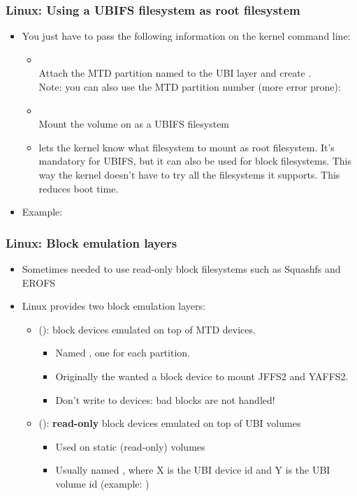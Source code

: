 \begin{frame}
  \frametitle{Linux: Using a UBIFS filesystem as root filesystem}
  \begin{itemize}
  \item You just have to pass the following information on the kernel
    command line:
    \begin{itemize}
    \item {}\\
      Attach the MTD partition named  to the UBI layer and
      create .\\
      Note: you can also use the MTD partition number (more error
      prone): 
    \item {}\\
      Mount the  volume on  as a UBIFS filesystem
    \item {} lets the kernel know what filesystem
      to mount as root filesystem. It's mandatory for UBIFS, but
      it can also be used for block filesystems. This way the kernel
      doesn't have to try all the filesystems it supports. This reduces
      boot time.
    \end{itemize}
  \item Example: 
  \end{itemize}
\end{frame}

\begin{frame}
  \frametitle{Linux: Block emulation layers}
  \begin{itemize}
  \item Sometimes needed to use read-only block filesystems such as Squashfs and EROFS
  \item Linux provides two block emulation layers:
    \begin{itemize}
    \item {} ():
       block devices emulated on top of MTD devices.
       \begin{itemize}
       \item Named , one for each partition.
       \item Originally the  wanted a block device to mount JFFS2 and YAFFS2.
       \item Don't write to  devices: bad blocks are not handled!
       \end{itemize}
    \item {} ():
       {\bf read-only} block devices emulated on top of UBI volumes
       \begin{itemize}
       \item Used on static (read-only) volumes
       \item Usually named , where X is the UBI device
             id and Y is the UBI volume id (example: )
       \end{itemize}
    \end{itemize}
  \end{itemize}
\end{frame}

